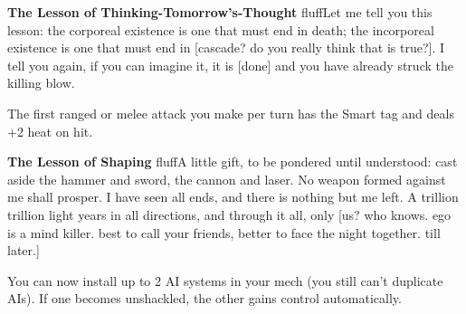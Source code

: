 \textbf{The Lesson of Thinking-Tomorrow's-Thought}\newline
fluff{Let me tell you this lesson: the corporeal existence is one that must end in death; the incorporeal existence is one that must end in [cascade? do you really think that is true?]. I tell you again, if you can imagine it, it is [done] and you have already struck the killing blow.}

The first ranged or melee attack you make per turn has the Smart tag and deals +2 heat on hit.


\textbf{The Lesson of Shaping}\newline
fluff{A little gift, to be pondered until understood: cast aside the hammer and sword, the cannon and laser. No weapon formed against me shall prosper. I have seen all ends, and there is nothing but me left. A trillion trillion light years in all directions, and through it all, only [us? who knows. ego is a mind killer. best to call your friends, better to face the night together. till later.]}

You can now install up to 2 AI systems in your mech (you still can't duplicate AIs). If one becomes unshackled, the other gains control automatically.


